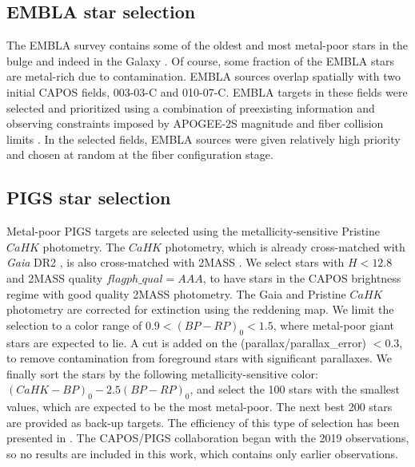 \documentclass[onecolumn]{aa}
\begin{document}
\subsection{EMBLA star selection}
The EMBLA survey contains some of the oldest and most metal-poor stars in the bulge and indeed in the Galaxy \citep{Howes2016}. 
Of course, some fraction of the EMBLA stars are metal-rich due to contamination. EMBLA sources overlap spatially with two initial CAPOS fields, 003-03-C
and 010-07-C.
EMBLA targets in these fields were selected and prioritized using a combination of preexisting information and observing constraints imposed by APOGEE-2S magnitude and fiber collision limits \citep{Zasowski2017, Santana2021}. In the selected fields, 
EMBLA sources were given relatively high priority and chosen at random at the fiber configuration stage. 

\subsection{PIGS star selection}

Metal-poor PIGS targets are selected using the metallicity-sensitive Pristine $CaHK$ photometry. The $CaHK$ photometry, which is already cross-matched with \textit{Gaia} DR2 \citep{Gaia-Collaboration2016, Gaia-Collaboration2018}, is also cross-matched with 2MASS \citep{Skrutskie2006}. We select stars with $H < 12.8$ and 2MASS quality $flag ph\_qual = AAA$, to have stars in the CAPOS brightness regime with good quality 2MASS photometry. The Gaia and Pristine $CaHK$ photometry are corrected for extinction using the \citet{Green2018} reddening map. 
We limit the selection to a color range of $0.9 < (BP - RP)_0 < 1.5$, where metal-poor giant stars are expected to lie. A cut is added on the (parallax/parallax\_error) $< 0.3$, to remove contamination from foreground stars with significant parallaxes. We finally sort the stars by the following metallicity-sensitive color: $(CaHK - BP)_0 - 2.5(BP - RP)_0$, and select the 100 stars with the smallest values, which are expected to be the most metal-poor. The next best 200 stars are provided as back-up targets. The efficiency of this type of selection has been presented in  \citet{Arentsen2020}. The CAPOS/PIGS collaboration began with the 2019 observations, so no results are included in this work, which contains only earlier observations.
\end{document}
